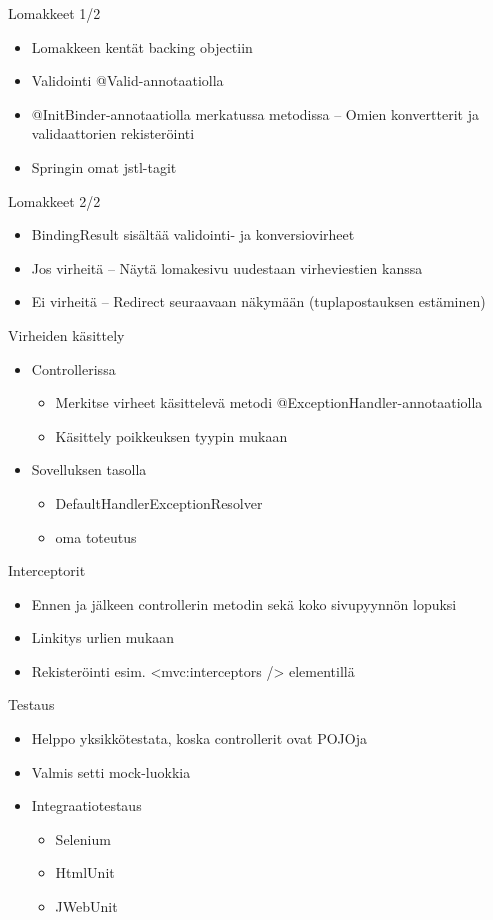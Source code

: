 \documentclass[hyperref={pdfauthor=\AUTHOR},14pt]{beamer}
\begin{document}
\begin{frame}[t, fragile]{Lomakkeet 1/2}
\begin{itemize}
\item Lomakkeen kentät backing objectiin
\item Validointi @Valid-annotaatiolla
\item @InitBinder-annotaatiolla merkatussa metodissa
-- Omien konvertterit ja validaattorien rekisteröinti
\item Springin omat jstl-tagit
\end{itemize}
\end{frame}

\begin{frame}[t, fragile]{Lomakkeet 2/2}
\begin{itemize}
\item BindingResult sisältää validointi- ja konversiovirheet
\item Jos virheitä
-- Näytä lomakesivu uudestaan virheviestien kanssa
\item Ei virheitä 
-- Redirect seuraavaan näkymään (tuplapostauksen estäminen)
\end{itemize}
\end{frame}

\begin{frame}[t, fragile]{Virheiden käsittely}
\begin{itemize}
\item Controllerissa
\begin{itemize}
\item Merkitse virheet käsittelevä metodi @ExceptionHandler-annotaatiolla
\item Käsittely poikkeuksen tyypin mukaan
\end{itemize}
\item Sovelluksen tasolla
\begin{itemize}
\item DefaultHandlerExceptionResolver 
\item oma toteutus
\end{itemize}
\end{itemize}
\end{frame}

\begin{frame}[t, fragile]{Interceptorit}
\begin{itemize}
\item Ennen ja jälkeen controllerin metodin sekä koko sivupyynnön lopuksi
\item Linkitys urlien mukaan
\item Rekisteröinti esim. <mvc:interceptors /> elementillä
\end{itemize}
\end{frame}

\begin{frame}[t, fragile]{Testaus}
\begin{itemize}
\item Helppo yksikkötestata, koska controllerit ovat POJOja
\item Valmis setti mock-luokkia
\item Integraatiotestaus
\begin{itemize}
\item Selenium
\item HtmlUnit
\item JWebUnit
\end{itemize}
\end{itemize}
\end{frame}
\end{document}
